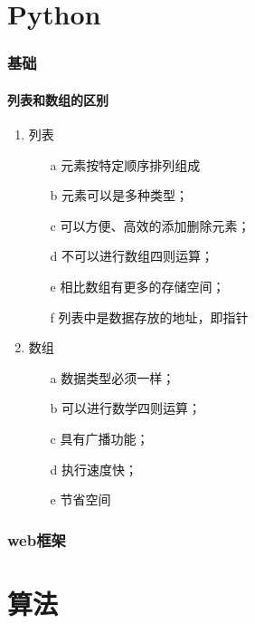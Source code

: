 \documentclass{paper}
\begin{document}
	\part{Python}
	\section{基础}
	\subsection{列表和数组的区别}
	\begin{enumerate}
		\item 列表
		\begin{enumerate}
			\item[a] 元素按特定顺序排列组成
			\item[b] 元素可以是多种类型；
			\item[c] 可以方便、高效的添加删除元素；
			\item[d] 不可以进行数组四则运算；
			\item[e] 相比数组有更多的存储空间；
			\item[f] 列表中是数据存放的地址，即指针
		\end{enumerate}
		\item 数组
		\begin{enumerate}
			\item[a] 数据类型必须一样；
			\item[b] 可以进行数学四则运算；
			\item[c] 具有广播功能；
			\item[d] 执行速度快；
			\item[e] 节省空间
		\end{enumerate}
	\end{enumerate}
	
	\section{web框架}
	
	\part{算法}
\end{document}
